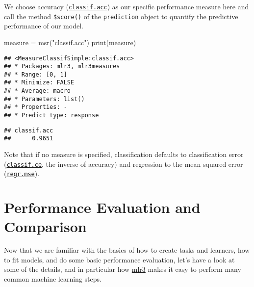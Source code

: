 \documentclass[
]{scrbook}
\newenvironment{Shaded}{\begin{snugshade}}{\end{snugshade}}
\newcommand{\FunctionTok}[1]{\textcolor[rgb]{0.00,0.00,0.00}{#1}}
\newcommand{\NormalTok}[1]{#1}
\newcommand{\OtherTok}[1]{\textcolor[rgb]{0.56,0.35,0.01}{#1}}
\newcommand{\SpecialCharTok}[1]{\textcolor[rgb]{0.00,0.00,0.00}{#1}}
\newcommand{\StringTok}[1]{\textcolor[rgb]{0.31,0.60,0.02}{#1}}
\renewenvironment{Shaded} {\begin{snugshade}\small} {\end{snugshade}}
\begin{document}
We choose accuracy (\href{https://mlr3.mlr-org.com/reference/mlr_measures_classif.acc.html}{\texttt{classif.acc}}) as our specific performance measure here and call the method \texttt{\$score()} of the \texttt{prediction} object to quantify the predictive performance of our model.

\begin{Shaded}
\begin{Highlighting}[]
\NormalTok{measure }\OtherTok{=} \FunctionTok{msr}\NormalTok{(}\StringTok{"classif.acc"}\NormalTok{)}
\FunctionTok{print}\NormalTok{(measure)}
\end{Highlighting}
\end{Shaded}

\begin{verbatim}
## <MeasureClassifSimple:classif.acc>
## * Packages: mlr3, mlr3measures
## * Range: [0, 1]
## * Minimize: FALSE
## * Average: macro
## * Parameters: list()
## * Properties: -
## * Predict type: response
\end{verbatim}

\begin{Shaded}
\end{Shaded}

\begin{verbatim}
## classif.acc 
##      0.9651
\end{verbatim}

Note that if no measure is specified, classification defaults to classification error (\href{https://mlr3.mlr-org.com/reference/mlr_measures_classif.ce.html}{\texttt{classif.ce}}, the inverse of accuracy) and regression to the mean squared error (\href{https://mlr3.mlr-org.com/reference/mlr_measures_regr.mse.html}{\texttt{regr.mse}}).

\hypertarget{perf-eval-cmp}{%
\chapter{Performance Evaluation and Comparison}\label{perf-eval-cmp}}

Now that we are familiar with the basics of how to create tasks and learners, how to fit models, and do some basic performance evaluation, let's have a look at some of the details, and in particular how \href{https://mlr3.mlr-org.com}{mlr3} makes it easy to perform many common machine learning steps.
\end{document}
